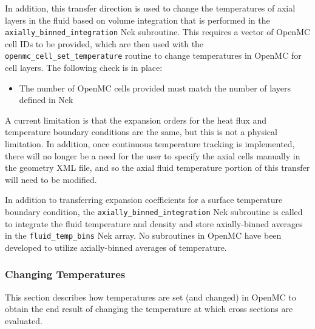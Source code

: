 \documentclass[10pt]{article}
\numberwithin{equation}{section} %
\begin{document}
In addition, this transfer direction is used to change the temperatures of axial layers in the fluid based on volume integration that is performed in the {\tt axially\_binned\_integration} Nek subroutine. This requires a vector of OpenMC cell IDs to be provided, which are then used with the {\tt openmc\_cell\_set\_temperature} routine to change temperatures in OpenMC for cell layers. The following check is in place:

\begin{itemize}
\item The number of OpenMC cells provided must match the number of layers defined in Nek
\end{itemize}

\color{magenta} A current limitation is that the expansion orders for the heat flux and temperature boundary conditions are the same, but this is not a physical limitation. In addition, once continuous temperature tracking is implemented, there will no longer be a need for the user to specify the axial cells manually in the geometry XML file, and so the axial fluid temperature portion of this transfer will need to be modified.\color{black}

In addition to transferring expansion coefficients for a surface temperature boundary condition, the {\tt axially\_binned\_integration} Nek subroutine is called to integrate the fluid temperature and density and store axially-binned averages in the {\tt fluid\_temp\_bins} Nek array. No subroutines in OpenMC have been developed to utilize axially-binned averages of temperature.

\subsubsection{Changing Temperatures}
This section describes how temperatures are set (and changed) in OpenMC to obtain the end result of changing the temperature at which cross sections are evaluated.
\end{document}
